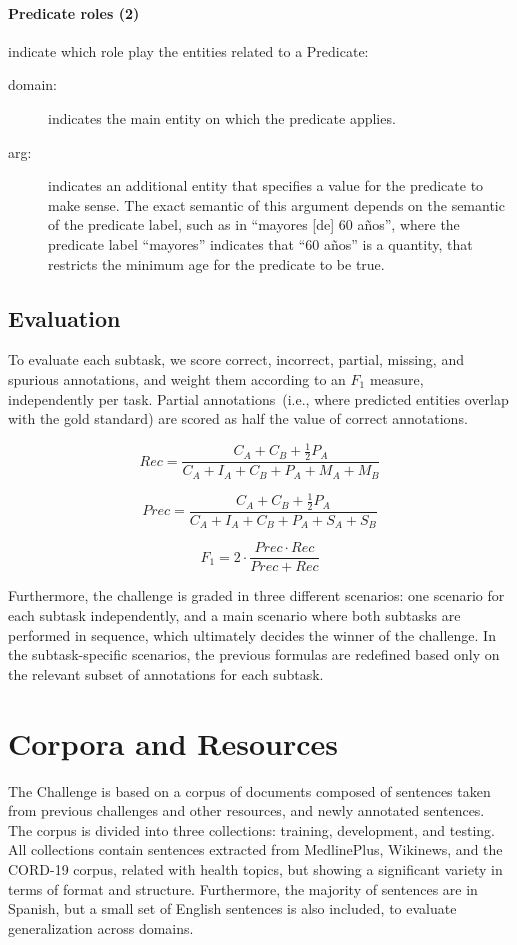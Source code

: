 \documentclass[a4paper,11pt,twocolumn,twoside]{article}
\begin{document}
\paragraph{Predicate roles (2)} indicate which role play the entities related to a Predicate:

\begin{description}
  \item[domain:] indicates the main entity on which the predicate applies.
  \item[arg:] indicates an additional entity that specifies a value for the predicate to make sense. The exact semantic of this argument depends on the semantic of the predicate label, such as in “mayores [de] 60 años”, where the predicate label “mayores” indicates that “60 años” is a quantity, that restricts the minimum age for the predicate to be true.
\end{description}

\subsection{Evaluation}

To evaluate each subtask, we score correct, incorrect, partial, missing, and spurious
annotations, and weight them according to an $F_1$ measure, independently per task.
Partial annotations~(i.e., where predicted entities overlap with the gold standard) are scored as half the value of correct annotations.

$$Rec = \frac{C_A + C_B + \frac{1}{2} P_A}{C_A + I_A + C_B + P_A + M_A + M_B}$$

$$Prec = \frac{C_A + C_B + \frac{1}{2} P_A}{C_A + I_A + C_B + P_A + S_A + S_B}$$

$$F_1 = 2 \cdot \frac{Prec \cdot Rec}{Prec + Rec}$$

Furthermore, the challenge is graded in three different scenarios:
one scenario for each subtask independently, and a main scenario where both subtasks are performed in sequence, which ultimately decides the winner of the challenge.
In the subtask-specific scenarios, the previous formulas are redefined based only on the relevant subset of annotations for each subtask.

\section{Corpora and Resources}\label{sec:resources}

The Challenge is based on a corpus of documents composed of
sentences taken from previous challenges and other resources,
and newly annotated sentences.
The corpus is divided into three collections: training, development, and testing.
All collections contain sentences extracted from MedlinePlus, Wikinews, and the CORD-19 corpus, related with health topics, but showing a significant variety in terms of format and structure.
Furthermore, the majority of sentences are in Spanish, but a small set of English sentences is also included, to evaluate generalization across domains.
\end{document}
